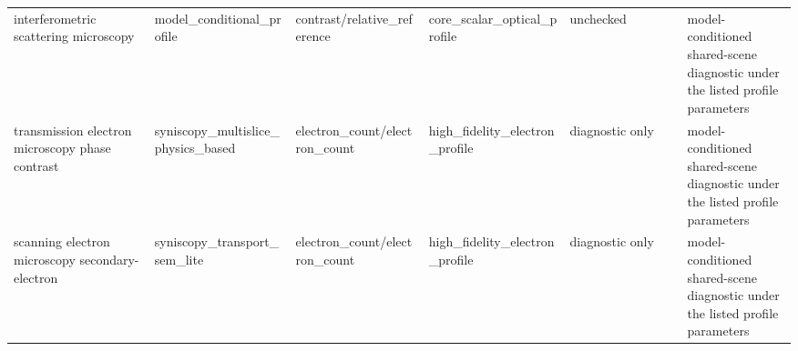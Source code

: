 \begin{tabular}{p{0.18\linewidth}p{0.18\linewidth}p{0.17\linewidth}p{0.18\linewidth}p{0.15\linewidth}p{0.14\linewidth}}
interfero\allowbreak{}metric scattering microscopy & model\_conditional\_profile & contrast/relative\_reference & core\_scalar\_optical\_profile & unchecked & model-conditioned shared-scene diagnostic under the listed profile parameters \\
transmission electron microscopy phase contrast & syniscopy\_multislice\_physics\_based & electron\_count/electron\_count & high\_fidelity\_electron\_profile & diagnostic only & model-conditioned shared-scene diagnostic under the listed profile parameters \\
scanning electron microscopy secondary-electron & syniscopy\_transport\_sem\_lite & electron\_count/electron\_count & high\_fidelity\_electron\_profile & diagnostic only & model-conditioned shared-scene diagnostic under the listed profile parameters \\
\bottomrule
\end{tabular}

